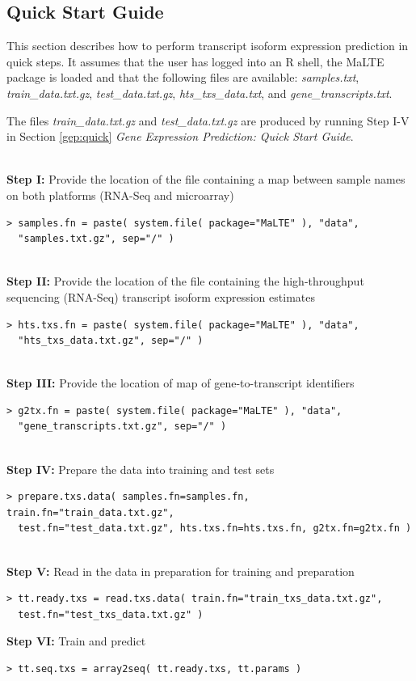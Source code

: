 \documentclass[a4paper,12pt]{article}
\begin{document}
\subsection{Quick Start Guide}
\label{tiep:quick}
This section describes how to perform transcript isoform expression prediction in quick steps. It assumes that the user has logged into an \textsf{R} shell, the \textsf{MaLTE} package is loaded and that the following files are available: \textit{samples.txt}, \textit{train\_data.txt.gz}, \textit{test\_data.txt.gz}, \textit{hts\_txs\_data.txt}, and \textit{gene\_transcripts.txt}.

The files \textit{train\_data.txt.gz} and \textit{test\_data.txt.gz} are produced by running Step I-V in Section \ref{gep:quick} \textit{Gene Expression Prediction: Quick Start Guide}.

\noindent\\
\textbf{Step I:} Provide the location of the file containing a map between sample names on both platforms (RNA-Seq and microarray)
\begin{verbatim}
> samples.fn = paste( system.file( package="MaLTE" ), "data", 
  "samples.txt.gz", sep="/" )
\end{verbatim}

\noindent\\
\textbf{Step II:} Provide the location of the file containing the high-throughput sequencing (RNA-Seq) transcript isoform expression estimates
\begin{verbatim}
> hts.txs.fn = paste( system.file( package="MaLTE" ), "data", 
  "hts_txs_data.txt.gz", sep="/" )
\end{verbatim}

\noindent\\
\textbf{Step III:} Provide the location of map of gene-to-transcript identifiers
\begin{verbatim}
> g2tx.fn = paste( system.file( package="MaLTE" ), "data", 
  "gene_transcripts.txt.gz", sep="/" )
\end{verbatim}

\noindent\\
\textbf{Step IV:} Prepare the data into training and test sets
\begin{verbatim}
> prepare.txs.data( samples.fn=samples.fn, train.fn="train_data.txt.gz", 
  test.fn="test_data.txt.gz", hts.txs.fn=hts.txs.fn, g2tx.fn=g2tx.fn )
\end{verbatim}

\noindent\\
\textbf{Step V:} Read in the data in preparation for training and preparation
\begin{verbatim}
> tt.ready.txs = read.txs.data( train.fn="train_txs_data.txt.gz", 
  test.fn="test_txs_data.txt.gz" )
\end{verbatim}
\textbf{Step VI:} Train and predict
\begin{verbatim}
> tt.seq.txs = array2seq( tt.ready.txs, tt.params )
\end{verbatim}
\end{document}
